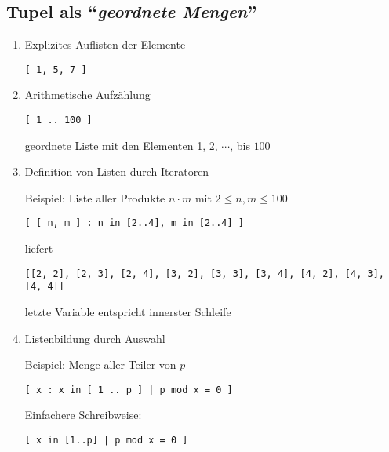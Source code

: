 \documentclass{article}
\begin{document}
\subsection{Tupel als ``\emph{geordnete Mengen}''}
\begin{enumerate}
\item Explizites Auflisten der Elemente 

      \texttt{[ 1, 5, 7 ]}
\item Arithmetische Aufz\"{a}hlung

      \texttt{[ 1 .. 100 ]}

      geordnete Liste mit den Elementen 1, 2, $\cdots$, bis $100$

\item Definition von Listen durch Iteratoren 
      
      Beispiel: Liste aller Produkte $n \cdot m$ mit $2 \leq n, m \leq 100$

      \texttt{[ [ n, m ] : n in [2..4], m in  [2..4] ]}

      liefert

      \texttt{[[2, 2], [2, 3], [2, 4], [3, 2], [3, 3], [3, 4], [4, 2], [4, 3], [4, 4]]}
      
      letzte Variable entspricht innerster Schleife
      
\item Listenbildung durch Auswahl

      Beispiel: Menge aller Teiler von $p$

      \texttt{[ x : x in [ 1 .. p ] | p mod x = 0 ]}

      Einfachere Schreibweise:

      \texttt{[ x in [1..p] | p mod x = 0 ]}
\end{enumerate}
\end{document}
